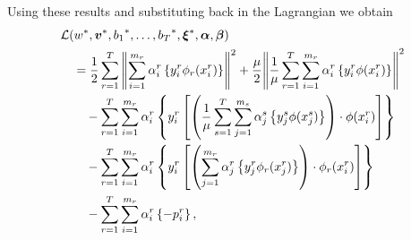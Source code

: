 Using these results and substituting back in the Lagrangian we obtain
\begin{equation}\nonumber
    \begin{aligned}
        &  \mathcal{L}({{w}}^*, {\bm{v}}^*, {b_1}^*, \ldots, {b_T}^*, {\bm{\xi}}^*, \bm{\alpha}, \bm{\beta}) \\
        &\quad =  \frac{1}{2} \sum_{r= 1}^T{\left\lVert\sum_{i=1}^{m_r} {\alpha_i^r} \left\lbrace y_i^r \phi_r({x}_i^r) \right\rbrace\right\rVert^2} + \frac{\mu}{2} {\left\lVert \frac{1}{\mu}\sum_{r= 1}^T \sum_{i=1}^{m_r} {\alpha_i^r} \left\lbrace y_i^r \phi({x}_i^r) \right\rbrace\right\rVert}^2 \\
        &\qquad -  \sum_{r= 1}^T \sum_{i=1}^{m_r} \alpha_i^r \left\lbrace y_{i}^r \left[ \left(\frac{1}{\mu} \sum_{s= 1}^T \sum_{j=1}^{m_s} {\alpha_j^s} \left\lbrace y_j^s \phi({x}_j^s) \right\rbrace \right) \cdot \phi({x}_{i}^r) \right]  \right\rbrace \\
        &\qquad -  \sum_{r= 1}^T \sum_{i=1}^{m_r} \alpha_i^r \left\lbrace y_{i}^r \left[  \left( \sum_{j=1}^{m_r} {\alpha_j^r} \left\lbrace y_j^r \phi_r({x}_j^r) \right\rbrace \right) \cdot \phi_r({x}_{i}^r)  \right]  \right\rbrace \\
        &\qquad -  \sum_{r= 1}^T \sum_{i=1}^{m_r} \alpha_i^r \left\lbrace - p_{i}^r  \right\rbrace ,
    \end{aligned}
\end{equation}
